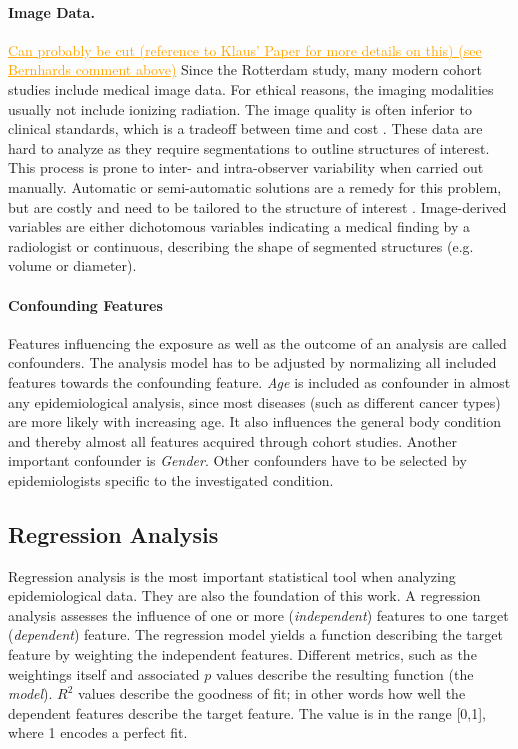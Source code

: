 \documentclass[journal]{style/vgtc} 			          %
\newcommand{\com}[1]{\textcolor{orange}{\uline{#1}}}
\begin{document}
\paragraph{Image Data.}
\com{Can probably be cut (reference to Klaus' Paper for more details on this) (see Bernhards comment above)}
Since the Rotterdam study, many modern cohort studies include medical image data.
For ethical reasons, the imaging modalities usually not include ionizing radiation.
The image quality is often inferior to clinical standards, which is a tradeoff between time and cost \cite{Preim2014}.
These data are hard to analyze as they require segmentations to outline structures of interest.
This process is prone to inter- and intra-observer variability when carried out manually.
Automatic or semi-automatic solutions are a remedy for this problem, but are costly and need to be tailored to the structure of interest \cite{Toennies2015}.
Image-derived variables are either dichotomous variables indicating a medical finding by a radiologist or continuous, describing the shape of segmented structures (e.g. volume or diameter).

\paragraph{Confounding Features}
Features influencing the exposure as well as the outcome of an analysis are called confounders.
The analysis model has to be adjusted by normalizing all included features towards the confounding feature.
\emph{Age} is included as confounder in almost any epidemiological analysis, since most diseases (such as different cancer types) are more likely with increasing age.
It also influences the general body condition and thereby almost all features acquired through cohort studies.
Another important confounder is \emph{Gender}.
Other confounders have to be selected by epidemiologists specific to the investigated condition.

\subsection{Regression Analysis} \label{sec:RegressionAnalysis}
Regression analysis is the most important statistical tool when analyzing epidemiological data.
They are also the foundation of this work.
A regression analysis assesses the influence of one or more (\emph{independent}) features to one target (\emph{dependent}) feature.
The regression model yields a function describing the target feature by weighting the independent features.
Different metrics, such as the weightings itself and associated $p$ values describe the resulting function (the \emph{model}).
$R^2$ values describe the goodness of fit; in other words how well the dependent features describe the target feature.
The value is in the range [0,1], where 1 encodes a perfect fit.
\end{document}
